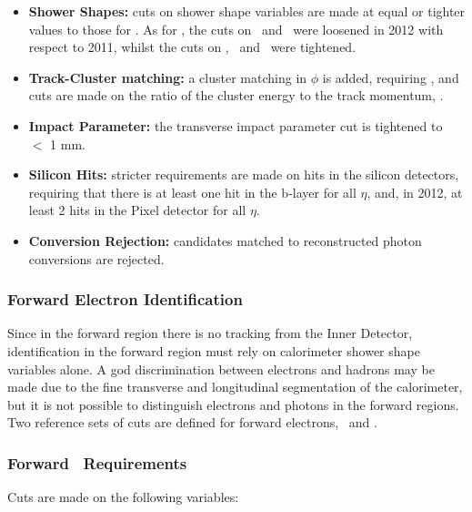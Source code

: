 \begin{itemize}
    \item {\bf Shower Shapes:} cuts on shower shape variables are made at equal
    or tighter values to those for \mediumPP. As for \mediumPP,
    the cuts on \Reta\ and \Rhad\ were loosened in 2012 with respect to 2011, 
    whilst the cuts on  \wetatwo, \Eratio\ and
    \wstot\ were tightened.

    \item {\bf Track-Cluster matching:} a cluster matching in $\phi$ is added,
    requiring , and cuts are made on the ratio of the cluster
    energy to the track momentum, \Eoverp.

    \item {\bf Impact Parameter:} the
    transverse impact parameter cut is tightened to \dzero\ $<$ 1 mm.

    \item {\bf Silicon Hits:} stricter requirements are made on hits in the
    silicon detectors, requiring that there is at least one hit in the b-layer for
    all $\eta$, and, in 2012, at least 2 hits in the Pixel detector for all
    $\eta$.

    \item {\bf Conversion Rejection:} candidates matched to reconstructed photon
    conversions are rejected.

\end{itemize}

\subsubsection{Forward Electron Identification}

Since in the forward region there is no tracking from the Inner Detector,
identification in the forward region must rely on calorimeter shower shape
variables alone. A god discrimination between electrons and hadrons may be made
due to the fine transverse and longitudinal segmentation of the calorimeter, but
it is not possible to distinguish electrons and photons in the forward regions.
Two reference sets of cuts are defined for forward electrons, \loose\ and
\tight.

\subsubsection{Forward \loose\ Requirements}

Cuts are made on the following variables:

